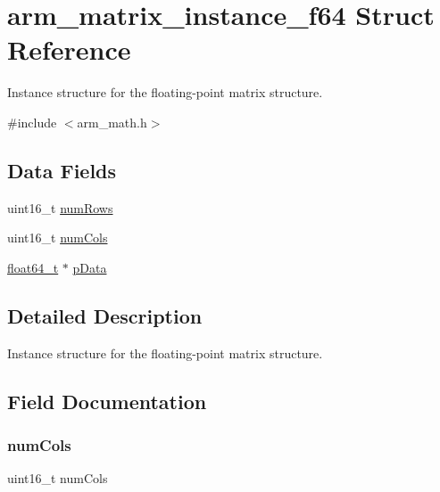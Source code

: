 \hypertarget{structarm__matrix__instance__f64}{}\section{arm\+\_\+matrix\+\_\+instance\+\_\+f64 Struct Reference}
\label{structarm__matrix__instance__f64}


Instance structure for the floating-\/point matrix structure.  




{\ttfamily \#include $<$arm\+\_\+math.\+h$>$}

\subsection*{Data Fields}
\begin{DoxyCompactItemize}
\item 
uint16\+\_\+t \mbox{\hyperlink{structarm__matrix__instance__f64_a1bcf80ccdc2acc29198f1592ae300390}{num\+Rows}}
\item 
uint16\+\_\+t \mbox{\hyperlink{structarm__matrix__instance__f64_a4bb5ec0d13eb4c9cf887aa8366a44117}{num\+Cols}}
\item 
\mbox{\hyperlink{arm__math_8h_ac55f3ae81b5bc9053760baacf57e47f4}{float64\+\_\+t}} $\ast$ \mbox{\hyperlink{structarm__matrix__instance__f64_aa7a4c9839c31e933360ef3a3167b9877}{p\+Data}}
\end{DoxyCompactItemize}


\subsection{Detailed Description}
Instance structure for the floating-\/point matrix structure. 

\subsection{Field Documentation}
\mbox{\label{structarm__matrix__instance__f64_a4bb5ec0d13eb4c9cf887aa8366a44117}} 
\subsubsection{\texorpdfstring{numCols}{numCols}}
{\footnotesize\ttfamily uint16\+\_\+t num\+Cols}

